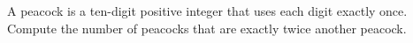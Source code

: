 A peacock is a ten-digit positive integer that uses each digit exactly once. Compute the number of peacocks that are exactly twice another peacock.